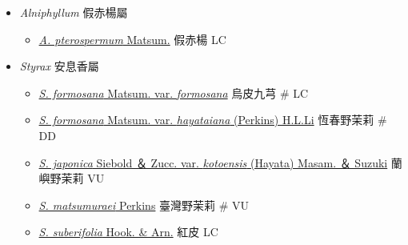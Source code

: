 
  \begin{itemize}
 \item[] \textit{Alniphyllum} 假赤楊屬
                                
  \begin{itemize}
        \item[] \href{http://www.theplantlist.org/tpl1.1/search?q=Alniphyllum+pterospermum}{\textit{A. pterospermum} Matsum.}   假赤楊   LC
  \end{itemize}
 \item[] \textit{Styrax} 安息香屬
                                
  \begin{itemize}
        \item[] \href{http://www.theplantlist.org/tpl1.1/search?q=Styrax+formosana+var.+formosana}{\textit{S. formosana} Matsum. var. \textit{formosana}}   烏皮九芎  \# LC
        \item[] \href{http://www.theplantlist.org/tpl1.1/search?q=Styrax+formosana+var.+hayataiana}{\textit{S. formosana} Matsum. var. \textit{hayataiana} (Perkins) H.L.Li}   恆春野茉莉  \# DD
        \item[] \href{http://www.theplantlist.org/tpl1.1/search?q=Styrax+japonica+var.+kotoensis}{\textit{S. japonica} Siebold ＆ Zucc. var. \textit{kotoensis} (Hayata) Masam. ＆ Suzuki}   蘭嶼野茉莉   VU
        \item[] \href{http://www.theplantlist.org/tpl1.1/search?q=Styrax+matsumuraei}{\textit{S. matsumuraei} Perkins}   臺灣野茉莉  \# VU
        \item[] \href{http://www.theplantlist.org/tpl1.1/search?q=Styrax+suberifolia}{\textit{S. suberifolia} Hook. \& Arn.}   紅皮   LC
  \end{itemize}
  \end{itemize}
